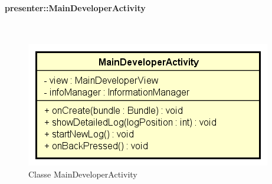 \documentclass[../DefinizioneDiProdotto.tex]{subfiles}
\begin{document}
\paragraph{presenter::MainDeveloperActivity}
\
\begin{figure}[H]
	\centering
	\includegraphics[width=\maxwidth]{img/MainDeveloperActivity.png}
	\caption{Classe MainDeveloperActivity}\label{fig:presenter::MainDeveloperActivity} 
\end{figure}
\end{document}
